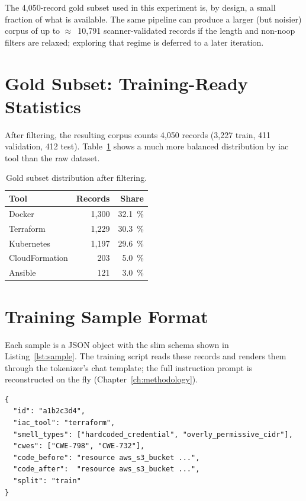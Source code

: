 \documentclass[12pt, a4paper]{report}
\begin{document}
The 4{,}050-record gold subset used in this experiment is, by design, a
small fraction of what is available. The same pipeline can produce a
larger (but noisier) corpus of up to \(\approx\)~10{,}791 scanner-validated
records if the length and non-noop filters are relaxed; exploring that
regime is deferred to a later iteration.

\section{Gold Subset: Training-Ready Statistics}

After filtering, the resulting corpus counts 4{,}050 records
(3{,}227 train, 411 validation, 412 test).
Table~\ref{tab:gold-distribution} shows a much more balanced distribution
by \gls{iac} tool than the raw dataset.

\begin{table}[H]
  \centering
  \caption{Gold subset distribution after filtering.}
  \label{tab:gold-distribution}
  \small
  \begin{tabular}{lrr}
    \toprule
    \textbf{Tool} & \textbf{Records} & \textbf{Share} \\
    \midrule
    Docker          & 1{,}300 & 32.1~\% \\
    Terraform       & 1{,}229 & 30.3~\% \\
    Kubernetes      & 1{,}197 & 29.6~\% \\
    CloudFormation  &    203 &  5.0~\% \\
    Ansible         &    121 &  3.0~\% \\
    \bottomrule
  \end{tabular}
\end{table}

\section{Training Sample Format}

Each sample is a JSON object with the slim schema shown in
Listing~\ref{lst:sample}. The training script reads these records and
renders them through the tokenizer's chat template; the full instruction
prompt is reconstructed on the fly (Chapter~\ref{ch:methodology}).

\begin{lstlisting}[caption={Schema of a training sample.},label={lst:sample}]
{
  "id": "a1b2c3d4",
  "iac_tool": "terraform",
  "smell_types": ["hardcoded_credential", "overly_permissive_cidr"],
  "cwes": ["CWE-798", "CWE-732"],
  "code_before": "resource aws_s3_bucket ...",
  "code_after":  "resource aws_s3_bucket ...",
  "split": "train"
}
\end{lstlisting}
\end{document}
